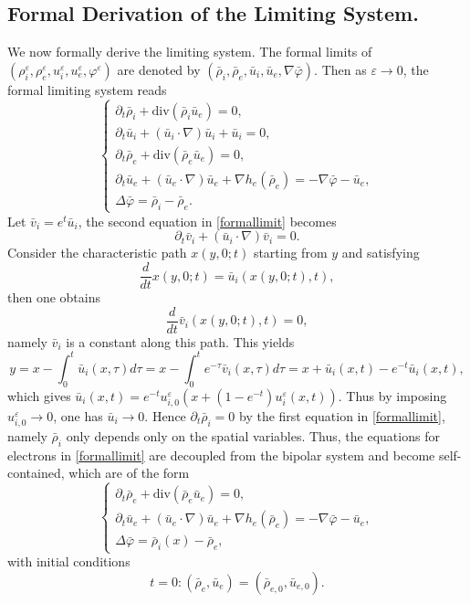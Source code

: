 \documentclass[reqno,twoside,12pt,a4paper]{amsart}
\newcommand{\eps}{\mathbb{\varepsilon}}
\newcommand{\dive}{\mathrm{div}}
\newcommand{\pt}{\partial_t}
\newcommand{\D}{\nabla}
\newcommand{\vp}{\varphi}
\numberwithin{equation}{section}
\begin{document}
\subsection{Formal Derivation of the Limiting System.} 
We now formally derive the limiting system. The formal limits of $(\rho_i^\eps,\rho_e^\eps,u_i^\eps,u_e^\eps,\varphi^\eps)$ are denoted by $(\bar{\rho}_i,\bar{\rho}_e,\bar{u}_i,\bar{u}_e,\nabla \bar{\varphi})$. Then as $\eps\to 0$, the formal limiting system reads
\begin{equation}\label{formallimit}
\begin{cases}
\pt \bar{\rho}_i+\dive(\bar{\rho}_i \bar{u}_e)=0,\\
\pt \bar{u}_i+(\bar{u}_i\cdot\nabla)\bar{u}_i+\bar{u}_i=0,\\
\pt \bar{\rho}_e +\dive(\bar{\rho}_e \bar{u}_e)=0,\\
\pt \bar{u}_e+(\bar{u}_e\cdot\nabla)\bar{u}_e+\nabla h_e(\bar{\rho}_e)=-\D\bar{\vp}-\bar{u}_e, \\
\Delta\bar{\vp}=\bar{\rho}_i-\bar{\rho}_e. 
\end{cases}
\end{equation}
Let $\bar{v}_i=e^t \bar{u}_i$, the second equation in \eqref{formallimit} becomes
\begin{equation*}
    \pt \bar{v}_i+(\bar{u}_i\cdot\nabla)\bar{v}_i=0.
\end{equation*}
Consider the characteristic path $x(y,0;t)$ starting from $y$ and satisfying
\[\frac{d}{dt}x(y,0;t)=\bar{u}_i(x(y,0;t),t),\]
then one obtains
\[
\frac{d}{dt}\bar{v}_i(x(y,0;t),t)=0,
\] namely $\bar{v}_i$ is a constant along this path. This yields
\[y=x-\int_0^t \bar{u}_i(x,\tau) d\tau=x-\int_0^t e^{-\tau} \bar{v}_i(x,\tau) d\tau = x+\bar{u}_i(x,t)- e^{-t} \bar{u}_i(x,t),
\]
which gives $\bar{u}_i(x,t)=e^{-t}u^\eps_{i,0}(x+(1- e^{-t}) u^\eps_{i}(x,t))$. Thus by imposing $u_{i,0}^\eps\to 0$, one has $\bar{u}_i \to 0$. Hence $\partial_t \bar{\rho}_i=0$ by the first equation in \eqref{formallimit}, namely $\bar{\rho}_i$ only depends only on the spatial variables. Thus, the equations for electrons in  \eqref{formallimit} are decoupled from the bipolar system and become self-contained, which are of the form
\begin{equation}\label{efinal}
\begin{cases}
\pt\bar{\rho}_e +\dive(\bar{\rho}_e \bar{u}_e)=0,\\
\pt \bar{u}_e +(\bar{u}_e\cdot\nabla)\bar{u}_e+\nabla h_e(\bar{\rho}_e)=-\D\bar{\vp}-\bar{u}_e,\\
\Delta \bar{\vp}=\bar{\rho}_i(x)-\bar{\rho}_e,
\end{cases}
\end{equation}
with initial conditions
\begin{equation}\label{efinalinitial}
t=0: (\bar{\rho}_e, \bar{u}_e)=(\bar{\rho}_{e,0},\bar{u}_{e,0}).
\end{equation}
\end{document}
